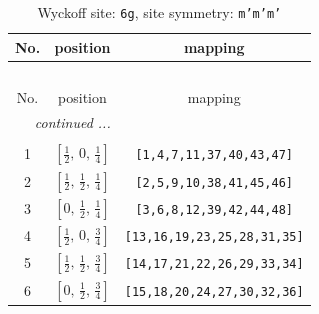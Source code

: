 \documentclass[fleqn,8pt]{jsarticle}
\begin{document}
\renewcommand{\arraystretch}{1.2}
\begin{longtable}{ccc}
\caption{Wyckoff site: {\tt 6g}, site symmetry: {\tt m'm'm'}}
 \\
 \hline \hline
No. & position & mapping \\ \hline \endfirsthead

\multicolumn{2}{l}{\tablename\ \thetable{}} \\
 \hline \hline
No. & position & mapping \\ \hline \endhead

 \hline \hline
\multicolumn{2}{r}{\footnotesize\it continued ...} \\ \endfoot

 \hline \hline
\multicolumn{2}{r}{} \\ \endlastfoot

1 & $\left[ \frac{1}{2},\, 0,\, \frac{1}{4} \right]$ & {\tt [1,4,7,11,37,40,43,47]} \\ \hline
2 & $\left[ \frac{1}{2},\, \frac{1}{2},\, \frac{1}{4} \right]$ & {\tt [2,5,9,10,38,41,45,46]} \\ \hline
3 & $\left[ 0,\, \frac{1}{2},\, \frac{1}{4} \right]$ & {\tt [3,6,8,12,39,42,44,48]} \\ \hline
4 & $\left[ \frac{1}{2},\, 0,\, \frac{3}{4} \right]$ & {\tt [13,16,19,23,25,28,31,35]} \\ \hline
5 & $\left[ \frac{1}{2},\, \frac{1}{2},\, \frac{3}{4} \right]$ & {\tt [14,17,21,22,26,29,33,34]} \\ \hline
6 & $\left[ 0,\, \frac{1}{2},\, \frac{3}{4} \right]$ & {\tt [15,18,20,24,27,30,32,36]} \\
\end{longtable}
\renewcommand{\arraystretch}{1.2}
\end{document}
